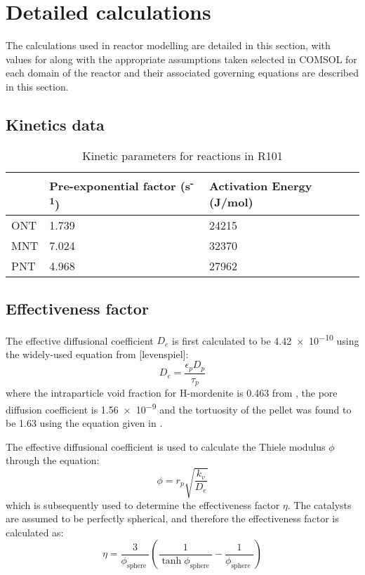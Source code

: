 \section{Detailed calculations}
\label{app:reaction}

The calculations used in reactor modelling are detailed in this section, with values for along with the appropriate assumptions taken selected in COMSOL for each domain of the reactor and their associated governing equations are described in this section.

\subsection{Kinetics data}

\begin{table}[h]
\centering
\caption{Kinetic parameters for reactions in R101}
\label{tab:R1-kinetic-params}
\begin{tabular}{@{}lll@{}}
\toprule
 & Pre-exponential factor (s\textsuperscript{-1}) & Activation Energy (J/mol) \\ \midrule
ONT & 1.739 & 24215 \\
MNT & 7.024 & 32370 \\
PNT & 4.968 & 27962 \\ \bottomrule
\end{tabular}
\end{table}

\subsection{Effectiveness factor}
\label{app:efffactor}
The effective diffusional coefficient $D_e$ is first calculated to be \num{4.42e-10} using the widely-used equation from [levenspiel]: 
\begin{equation}
    D_e = \frac{\epsilon_p D_p}{\tau_p}
\end{equation}
where the intraparticle void fraction for H-mordenite is 0.463 from \cite{saleman_capacity_2013}, the pore diffusion coefficient is \num{1.56e-9} and the tortuosity of the pellet was found to be 1.63 using the equation given in \textcite{lanfrey_tortuosity_2010}.

The effective diffusional coefficient is used to calculate the Thiele modulus $\phi$ through the equation:
\begin{equation}
    \phi = r_p \sqrt{\frac{k_v}{D_e}}
\end{equation}
which is subsequently used to determine the effectiveness factor $\eta$. The catalysts are assumed to be perfectly spherical, and therefore the effectiveness factor is calculated as: 
\begin{equation}
\eta=\frac{3}{\phi_{\text {sphere }}}\left(\frac{1}{\tanh \phi_{\text {sphere }}}-\frac{1}{\phi_{\text {sphere }}}\right)
\end{equation}


